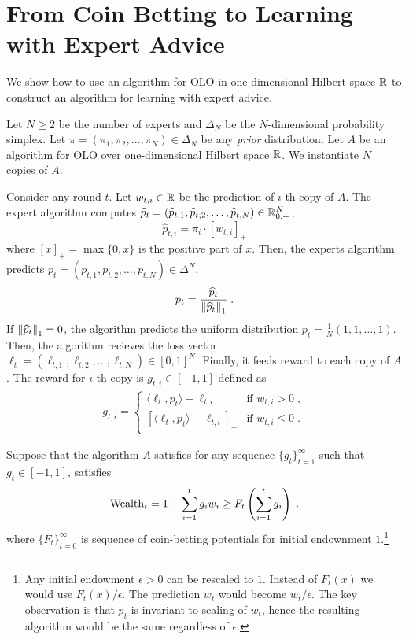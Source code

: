 \section{From Coin Betting to Learning with Expert Advice}
\label{section:reduction-experts}

We show how to use an algorithm for OLO in one-dimensional Hilbert space $\mathbb{R}$
to construct an algorithm for learning with expert advice.

Let $N \ge 2$ be the number of experts and $\Delta_N$ be the $N$-dimensional
probability simplex. Let $\pi = (\pi_1, \pi_2, \dots, \pi_N) \in \Delta_N$ be
any \emph{prior} distribution. Let $A$ be an algorithm for OLO over
one-dimensional Hilbert space $\mathbb{R}$. We instantiate $N$ copies of $A$.

Consider any round $t$. Let $w_{t,i} \in \mathbb{R}$ be the prediction of $i$-th copy of
$A$. The expert algorithm computes $\widehat p_t = (\widehat p_{t,1}, \widehat
p_{t,2}, \dots, \widehat p_{t,N}) \in \mathbb{R}_{0,+}^N$,
$$
\widehat p_{t,i} = \pi_i \cdot [w_{t,i}]_+
$$
where $[x]_+ = \max\{0,x\}$ is the positive part of $x$. Then, the experts
algorithm predicts $p_t = (p_{t,1}, p_{t,2}, \dots, p_{t,N}) \in \Delta^N$,
$$
p_t = \frac{\widehat p_t}{\left\|{\widehat p_t}\right\|_1} \; .
$$
If $\left\|{\widehat p_t}\right\|_1 = 0$, the algorithm predicts the uniform distribution
$p_t = \frac{1}{N}(1,1,\dots,1)$. Then, the algorithm recieves the loss vector
$\ell_t = (\ell_{t,1}, \ell_{t,2}, \dots, \ell_{t,N}) \in [0,1]^N$. Finally, it
feeds reward to each copy of $A$. The reward for $i$-th copy is $g_{t,i} \in
[-1,1]$ defined as
\begin{align}
g_{t,i} =
\begin{cases}
\langle \ell_t, p_t \rangle - \ell_{t,i} & \text{if } w_{t,i} > 0 \; , \\
\left[\langle \ell_t, p_t \rangle - \ell_{t,i} \right]_+ & \text{if } w_{t,i} \le 0 \; .
\end{cases}
\end{align}

Suppose that the algorithm $A$ satisfies for any sequence
$\{g_t\}_{t=1}^\infty$ such that $g_t \in [-1,1]$, satisfies
\begin{equation}
\label{equation:experts-one-dimensional-assumption}
\operatorname{Wealth}_t = 1 + \sum_{i=1}^t g_i w_i \ge F_t\left(\sum_{i=1}^t g_i\right) \; .
\end{equation}
where $\{F_t\}_{t=0}^\infty$ is sequence of coin-betting potentials for initial
endownment $1$.\footnote{Any initial endowment $\epsilon > 0$ can be rescaled to
$1$. Instead of $F_t(x)$ we would use $F_t(x)/\epsilon$. The prediction $w_t$
would become $w_t/\epsilon$. The key observation is that $p_t$ is invariant to
scaling of $w_t$, hence the resulting algorithm would be the same regardless of $\epsilon$.}

